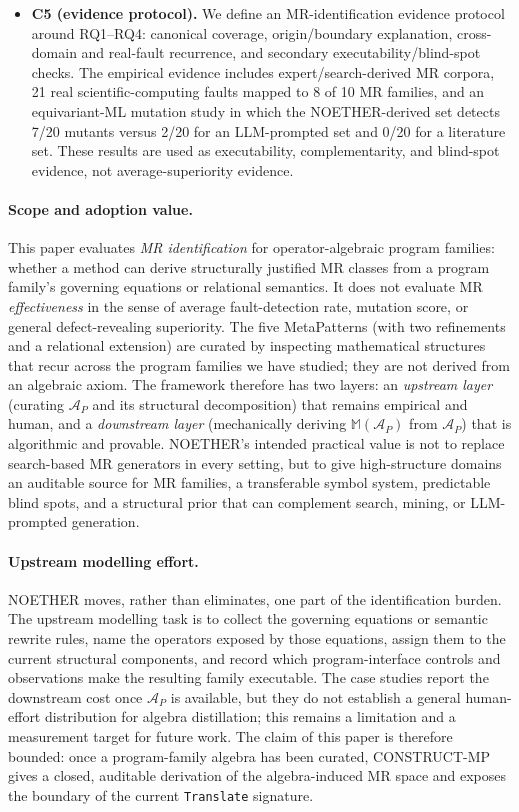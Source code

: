 \documentclass[acmsmall,screen,anonymous,review]{acmart}
\begin{document}
\begin{itemize}
  \item \textbf{C5 (evidence protocol).} We define an MR-identification evidence protocol around RQ1--RQ4: canonical coverage, origin/boundary explanation, cross-domain and real-fault recurrence, and secondary executability/blind-spot checks. The empirical evidence includes expert/search-derived MR corpora, 21 real scientific-computing faults mapped to 8 of 10 MR families, and an equivariant-ML mutation study in which the NOETHER-derived set detects 7/20 mutants versus 2/20 for an LLM-prompted set and 0/20 for a literature set. These results are used as executability, complementarity, and blind-spot evidence, not average-superiority evidence.
\end{itemize}

\paragraph{Scope and adoption value.} This paper evaluates \emph{MR identification} for operator-algebraic program families: whether a method can derive structurally justified MR classes from a program family's governing equations or relational semantics. It does not evaluate MR \emph{effectiveness} in the sense of average fault-detection rate, mutation score, or general defect-revealing superiority. The five MetaPatterns (with two refinements and a relational extension) are curated by inspecting mathematical structures that recur across the program families we have studied; they are not derived from an algebraic axiom. The framework therefore has two layers: an \emph{upstream layer} (curating $\mathcal{A}_P$ and its structural decomposition) that remains empirical and human, and a \emph{downstream layer} (mechanically deriving $\mathbb{M}(\mathcal{A}_P)$ from $\mathcal{A}_P$) that is algorithmic and provable. NOETHER's intended practical value is not to replace search-based MR generators in every setting, but to give high-structure domains an auditable source for MR families, a transferable symbol system, predictable blind spots, and a structural prior that can complement search, mining, or LLM-prompted generation.

\paragraph{Upstream modelling effort.} NOETHER moves, rather than eliminates, one part of the identification burden. The upstream modelling task is to collect the governing equations or semantic rewrite rules, name the operators exposed by those equations, assign them to the current structural components, and record which program-interface controls and observations make the resulting family executable. The case studies report the downstream cost once $\mathcal{A}_P$ is available, but they do not establish a general human-effort distribution for algebra distillation; this remains a limitation and a measurement target for future work. The claim of this paper is therefore bounded: once a program-family algebra has been curated, CONSTRUCT-MP gives a closed, auditable derivation of the algebra-induced MR space and exposes the boundary of the current \texttt{Translate} signature.
\end{document}
